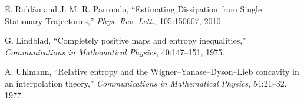 \documentclass[11pt]{article}
\newcommand{\1}{\mathbbm{1}}
\begin{document}
\begin{thebibliography}{20}
\'E. Rold\'an and J. M. R. Parrondo, ``Estimating Dissipation from Single Stationary Trajectories,'' \emph{Phys. Rev. Lett.}, 105:150607, 2010.

G. Lindblad, ``Completely positive maps and entropy inequalities,'' \emph{Communications in Mathematical Physics}, 40:147--151, 1975.

A. Uhlmann, ``Relative entropy and the Wigner--Yanase--Dyson--Lieb concavity in an interpolation theory,'' \emph{Communications in Mathematical Physics}, 54:21--32, 1977.

\end{thebibliography}
\end{document}
